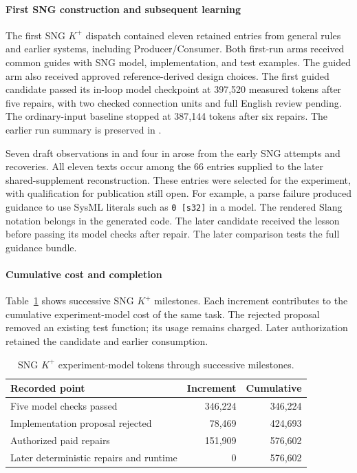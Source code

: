 \paragraph{First SNG construction and subsequent learning}
The first SNG $K^{+}$ dispatch contained eleven retained entries from general rules and earlier systems, including Producer/\allowbreak{}Consumer. Both first-run arms received common guides with SNG model, implementation, and test examples. The guided arm also received approved reference-derived design choices. The first guided candidate passed its in-loop model checkpoint at 397,520 measured tokens after five repairs, with two checked connection units and full English review pending. The ordinary-input baseline stopped at 387,144 tokens after six repairs. The earlier run summary is preserved in .

Seven draft observations in  and four in  arose from the early SNG attempts and recoveries. All eleven texts occur among the 66 entries supplied to the later shared-supplement reconstruction. These entries were selected for the experiment, with qualification for publication still open. For example, a parse failure produced guidance to use SysML literals such as \texttt{0 [s32]} in a model. The rendered Slang notation belongs in the generated code. The later candidate received the lesson before passing its model checks after repair. The later comparison tests the full guidance bundle.

\paragraph{Cumulative cost and completion}
Table~\ref{tab:sng-cost-detail} shows successive SNG $K^{+}$ milestones. Each increment contributes to the cumulative experiment-model cost of the same task. The rejected proposal removed an existing test function; its usage remains charged. Later authorization retained the candidate and earlier consumption.

\begin{table}[!htbp]
\caption{SNG $K^{+}$ experiment-model tokens through successive milestones.}
\label{tab:sng-cost-detail}
\centering\small
\begin{tabular}{@{}p{.51\linewidth}rr@{}}
\hline
Recorded point & Increment & Cumulative \\
\hline
Five model checks passed & 346,224 & 346,224 \\
Implementation proposal rejected & 78,469 & 424,693 \\
Authorized paid repairs & 151,909 & 576,602 \\
Later deterministic repairs and runtime & 0 & 576,602 \\
\hline
\end{tabular}
\end{table}

